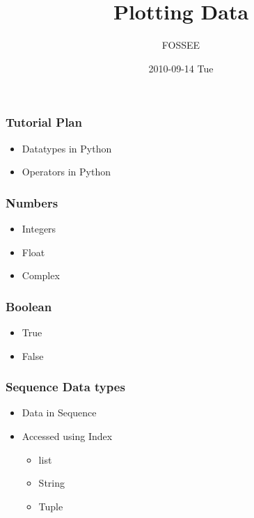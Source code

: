 \documentclass[presentation]{beamer}
\title{Plotting Data }
\author{FOSSEE}
\date{2010-09-14 Tue}
\begin{document}
\maketitle






\begin{frame}
\frametitle{Tutorial Plan}
\label{sec-1}
\begin{itemize}

\item Datatypes in Python\\
\label{sec-1.1}%
\item Operators in Python\\
\label{sec-1.2}%
\end{itemize} %
\end{frame}
\begin{frame}
\frametitle{Numbers}
\label{sec-2}
\begin{itemize}

\item Integers\\
\label{sec-2.1}%
\item Float\\
\label{sec-2.2}%
\item Complex\\
\label{sec-2.3}%
\end{itemize} %
\end{frame}
\begin{frame}
\frametitle{Boolean}
\label{sec-3}
\begin{itemize}

\item True\\
\label{sec-3.1}%
\item False\\
\label{sec-3.2}%
\end{itemize} %
\end{frame}
\begin{frame}
\frametitle{Sequence Data types}
\label{sec-4}
\begin{itemize}

\item Data in Sequence\\
\label{sec-4.1}%
\item Accessed using Index
\label{sec-4.2}%
\begin{itemize}

\item list\\
\label{sec-4.2.1}%
\item String\\
\label{sec-4.2.2}%
\item Tuple\\
\label{sec-4.2.3}%
\end{itemize} %
\end{itemize} %
\end{frame}
\end{document}
